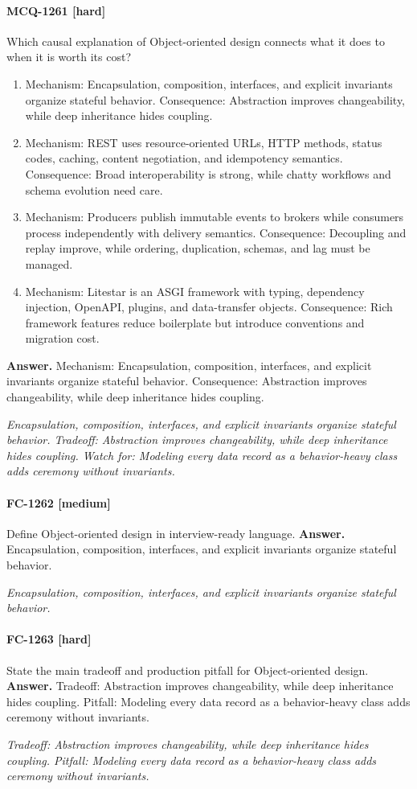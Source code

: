 \paragraph{MCQ-1261 [hard]} Which causal explanation of Object-oriented design connects what it does to when it is worth its cost?
\begin{enumerate}[label=\Alph*.]
\item Mechanism: Encapsulation, composition, interfaces, and explicit invariants organize stateful behavior. Consequence: Abstraction improves changeability, while deep inheritance hides coupling.
\item Mechanism: REST uses resource-oriented URLs, HTTP methods, status codes, caching, content negotiation, and idempotency semantics. Consequence: Broad interoperability is strong, while chatty workflows and schema evolution need care.
\item Mechanism: Producers publish immutable events to brokers while consumers process independently with delivery semantics. Consequence: Decoupling and replay improve, while ordering, duplication, schemas, and lag must be managed.
\item Mechanism: Litestar is an ASGI framework with typing, dependency injection, OpenAPI, plugins, and data-transfer objects. Consequence: Rich framework features reduce boilerplate but introduce conventions and migration cost.
\end{enumerate}
\noindent\textbf{Answer.} Mechanism: Encapsulation, composition, interfaces, and explicit invariants organize stateful behavior. Consequence: Abstraction improves changeability, while deep inheritance hides coupling.
\par\textit{Encapsulation, composition, interfaces, and explicit invariants organize stateful behavior. Tradeoff: Abstraction improves changeability, while deep inheritance hides coupling. Watch for: Modeling every data record as a behavior-heavy class adds ceremony without invariants.}
\paragraph{FC-1262 [medium]} Define Object-oriented design in interview-ready language.
\noindent\textbf{Answer.} Encapsulation, composition, interfaces, and explicit invariants organize stateful behavior.
\par\textit{Encapsulation, composition, interfaces, and explicit invariants organize stateful behavior.}
\paragraph{FC-1263 [hard]} State the main tradeoff and production pitfall for Object-oriented design.
\noindent\textbf{Answer.} Tradeoff: Abstraction improves changeability, while deep inheritance hides coupling. Pitfall: Modeling every data record as a behavior-heavy class adds ceremony without invariants.
\par\textit{Tradeoff: Abstraction improves changeability, while deep inheritance hides coupling. Pitfall: Modeling every data record as a behavior-heavy class adds ceremony without invariants.}
